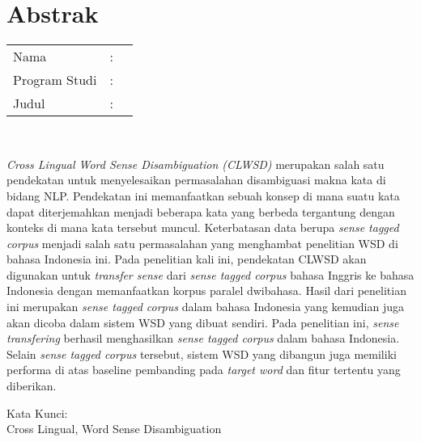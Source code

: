 %
%
%

\chapter*{Abstrak}

\vspace*{0.2cm}

\noindent \begin{tabular}{l l p{10cm}}
	Nama&: & \penulis \\
	Program Studi&: & \program \\
	Judul&: & \judul \\
\end{tabular} \\ 

\vspace*{0.5cm}

\noindent
\textit{Cross Lingual Word Sense Disambiguation (CLWSD)} merupakan salah satu pendekatan untuk menyelesaikan permasalahan disambiguasi makna kata di bidang NLP. Pendekatan ini memanfaatkan sebuah konsep di mana suatu kata dapat diterjemahkan menjadi beberapa kata yang berbeda tergantung dengan konteks di mana kata tersebut muncul. Keterbatasan data berupa \textit{sense tagged corpus} menjadi salah satu permasalahan yang menghambat penelitian WSD di bahasa Indonesia ini. Pada penelitian kali ini, pendekatan CLWSD akan digunakan untuk \textit{transfer sense} dari \textit{sense tagged corpus} bahasa Inggris ke bahasa Indonesia dengan memanfaatkan korpus paralel dwibahasa. Hasil dari penelitian ini merupakan \textit{sense tagged corpus} dalam bahasa Indonesia yang kemudian juga akan dicoba dalam sistem WSD yang dibuat sendiri. Pada penelitian ini, \textit{sense transfering} berhasil menghasilkan \textit{sense tagged corpus} dalam bahasa Indonesia. Selain \textit{sense tagged corpus} tersebut, sistem WSD yang dibangun juga memiliki performa di atas baseline pembanding pada \textit{target word} dan fitur tertentu yang diberikan.


\vspace*{0.2cm}

\noindent Kata Kunci: \\ 
\noindent Cross Lingual, Word Sense Disambiguation

\newpage